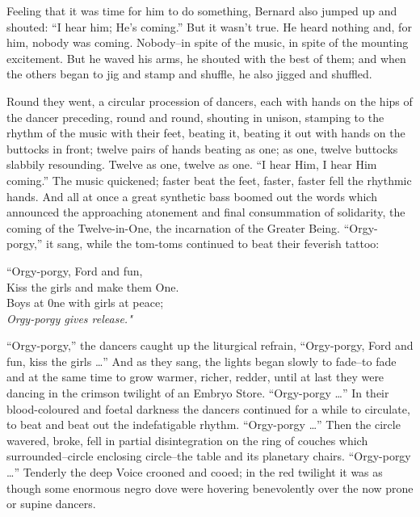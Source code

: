 \documentclass[12pt]{report}
\begin{document}
Feeling that it was time for him to do something, Bernard also jumped up
and shouted: ``I hear him; He's coming.'' But it wasn't true. He heard
nothing and, for him, nobody was coming. Nobody--in spite of the music,
in spite of the mounting excitement. But he waved his arms, he shouted
with the best of them; and when the others began to jig and stamp and
shuffle, he also jigged and shuffled.

Round they went, a circular procession of dancers, each with hands on
the hips of the dancer preceding, round and round, shouting in unison,
stamping to the rhythm of the music with their feet, beating it, beating
it out with hands on the buttocks in front; twelve pairs of hands
beating as one; as one, twelve buttocks slabbily resounding. Twelve as
one, twelve as one. ``I hear Him, I hear Him coming.'' The music
quickened; faster beat the feet, faster, faster fell the rhythmic hands.
And all at once a great synthetic bass boomed out the words which
announced the approaching atonement and final consummation of
solidarity, the coming of the Twelve-in-One, the incarnation of the
Greater Being. ``Orgy-porgy,'' it sang, while the tom-toms continued to
beat their feverish tattoo:

\emph{}

``Orgy-porgy, Ford and fun,\\

Kiss the girls and make them One.\\

Boys at 0ne with girls at peace;\\

\emph{Orgy-porgy gives release."\\
}

``Orgy-porgy,'' the dancers caught up the liturgical refrain,
``Orgy-porgy, Ford and fun, kiss the girls \ldots{}'' And as they sang,
the lights began slowly to fade--to fade and at the same time to grow
warmer, richer, redder, until at last they were dancing in the crimson
twilight of an Embryo Store. ``Orgy-porgy \ldots{}'' In their
blood-coloured and foetal darkness the dancers continued for a while to
circulate, to beat and beat out the indefatigable rhythm. ``Orgy-porgy
\ldots{}'' Then the circle wavered, broke, fell in partial
disintegration on the ring of couches which surrounded--circle enclosing
circle--the table and its planetary chairs. ``Orgy-porgy \ldots{}''
Tenderly the deep Voice crooned and cooed; in the red twilight it was as
though some enormous negro dove were hovering benevolently over the now
prone or supine dancers.
\end{document}
